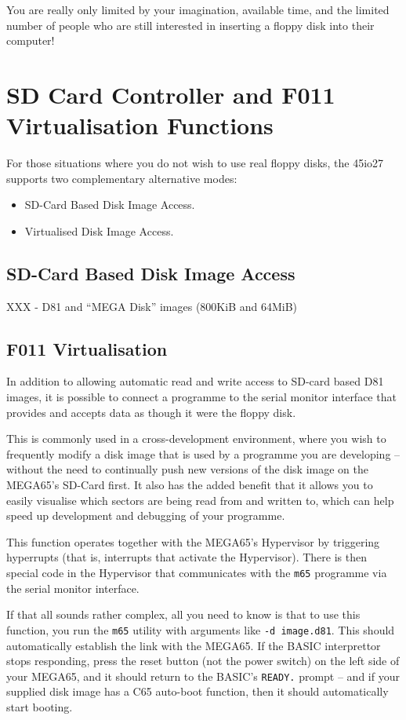 You are really only limited by your imagination, available time, and
the limited number of people who are still interested in inserting a
floppy disk into their computer!

\section{SD Card Controller and F011 Virtualisation Functions}

For those situations where you do not wish to use real floppy disks,
the 45io27 supports two complementary alternative modes:

\begin{itemize}
\item SD-Card Based Disk Image Access.
\item Virtualised Disk Image Access.
\end{itemize}

\subsection{SD-Card Based Disk Image Access}

XXX - D81 and ``MEGA Disk'' images (800KiB and 64MiB)

\subsection{F011 Virtualisation}

In addition to allowing automatic read and write access to SD-card
based D81 images, it is possible to connect a programme to the serial
monitor interface that provides and accepts data as though it were the
floppy disk.

This is commonly used in a cross-development
environment, where you wish to frequently modify a disk image that is
used by a programme you are developing -- without the need to
continually push new versions of the disk image on the MEGA65's
SD-Card first. It also has the added benefit that it allows you to
easily visualise which sectors are being read from and written to,
which can help speed up development and debugging of your programme.

This function operates together with the MEGA65's Hypervisor by
triggering hyperrupts (that is, interrupts that activate the
Hypervisor).  There is then special code in the Hypervisor that
communicates with the {\tt m65} programme via the serial monitor
interface.

If that all sounds rather complex, all you need to know is that to use
this function, you run the {\tt m65} utility with arguments like
{\tt -d image.d81}.  This should automatically establish the link with
the MEGA65.  If the BASIC interprettor stops responding, press the
reset button (not the power switch) on the left side of your MEGA65,
and it should return to the BASIC's {\tt READY.} prompt -- and if your
supplied disk image has a C65 auto-boot function, then it should
automatically start booting.

